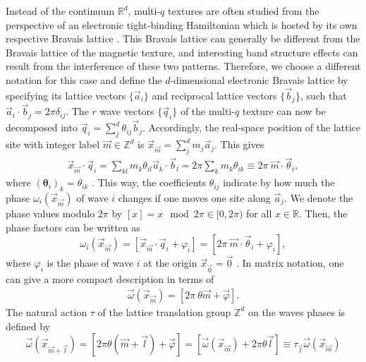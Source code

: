 \documentclass[submission, Phys]{SciPost}
\begin{document}
Instead of the continuum $\mathbb{R}^d$, multi-$q$ textures are often studied from the perspective of an electronic tight-binding Hamiltonian which is hosted by its own respective Bravais lattice \cite{Hamamoto2015, Gobel2017}. 
This Bravais lattice can generally be different from the Bravais lattice of the magnetic texture, and interesting band structure effects can result from the interference of these two patterns.
Therefore, we choose a different notation for this case and define the $d$-dimensional electronic Bravais lattice by specifying its lattice vectors $\{\vec{a}_i\}$ and reciprocal lattice vectors $\{\vec{b}_j\}$, such that $\vec{a}_i\cdot \vec{b}_j=2\pi\delta_{ij}$.
The $r$ wave vectors $\{\vec{q}_i\}$ of the multi-$q$ texture can now be decomposed into $\vec{q}_i=\sum_j^d \theta_{ij} \vec{b}_j$. 
Accordingly, the real-space position of the lattice site with integer label $\vec{m}\in\mathbb{Z}^d$ is $\vec{x}_{\vec{m}}=\sum_j^d m_j \vec{a}_j$.
This gives
\begin{align}
     \vec{x}_{\vec{m}} \cdot \vec{q}_i 
   = \sum_{kl} m_k \theta_{il} \vec{a}_k \cdot \vec{b}_l 
   = 2\pi \sum_{k} m_k \theta_{ik}  \equiv 2\pi ~\vec{m}\cdot \vec{\theta}_i,
\end{align}
where $(\boldsymbol{\theta}_i)_k=\theta_{ik}$ .
This way, the coefficients $\theta_{ij}$ indicate by how much the phase $\omega_i(\vec{x}_{\vec{m}})$ of wave $i$ changes if one moves one site along $\vec{a}_j$.
We denote the phase values modulo $2\pi$ by $[x] = x \mod 2\pi  \in [0,2\pi)$ for all $x\in \mathbb{R}$. 
Then, the phase factors can be written as
\begin{equation}
\omega_i(\vec{x}_{\vec{m}})=[\vec{x}_{\vec{m}}\cdot \vec{q}_i + \varphi_i ] = [2\pi~\vec{m}\cdot \vec{\theta}_i + \varphi_i ],
\end{equation}
where $\varphi_i$ is the phase of wave $i$ at the origin $\vec{x}_{\vec{0}}=\vec{0}$ \cite{Lux2024}.
In matrix notation, one can give a more compact description in terms of
\begin{align}
    \vec{\omega}(\vec{x}_{\vec{m}}) = [2\pi ~\theta  \vec{m} + \vec{\varphi}] .
\end{align}
The natural action $\tau$ of the lattice translation group $\mathbb{Z}^d$ on the waves phases is defined by
\begin{equation}
    \vec{\omega}(\vec{x}_{\vec{m}+\vec{l}})= [ 2\pi\theta(\vec{m}+\vec{l})  + \vec{\varphi} ]
    =
    [\vec{\omega}(\vec{x}_{\vec{m}}) + 2\pi \theta \vec{l} ]  \equiv \tau_{\vec{l}}  \vec{\omega}(\vec{x}_{\vec{m}})
    \label{eq:phasetranslations}
\end{equation}
\end{document}
